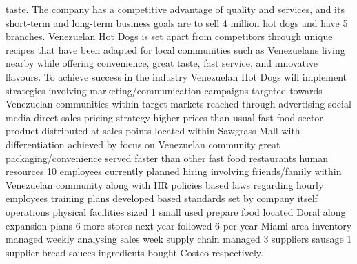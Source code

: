   taste. The company has a competitive advantage of quality and services, and its short-term and long-term business goals are to sell 4 million hot dogs and have 5 branches. Venezuelan Hot Dogs is set apart from competitors through unique recipes that have been adapted for local communities such as Venezuelans living nearby while offering convenience, great taste, fast service, and innovative flavours. To achieve success in the industry Venezuelan Hot Dogs will implement strategies involving marketing/communication campaigns targeted towards Venezuelan communities within target markets reached through advertising social media direct sales pricing strategy higher prices than usual fast food sector product distributed at sales points located within Sawgrass Mall with differentiation achieved by focus on Venezuelan community great packaging/convenience served faster than other fast food restaurants human resources 10 employees currently planned hiring involving friends/family within Venezuelan community along with HR policies based laws regarding hourly employees training plans developed based standards set by company itself operations physical facilities sized 1 small used prepare food located Doral along expansion plans 6 more stores next year followed 6 per year Miami area inventory managed weekly analysing sales week supply chain managed 3 suppliers sausage 1 supplier bread sauces ingredients bought Costco respectively.